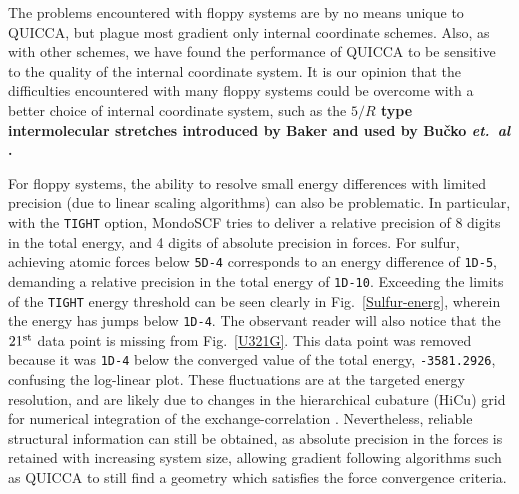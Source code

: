 \twolinestyle{\documentclass[prb,preprint]{revtex4}}
\begin{document}
The problems encountered with floppy systems are by no means unique to QUICCA,
but plague most gradient only internal coordinate schemes.  Also, as with other
schemes, we have found the performance of QUICCA to be sensitive to the quality 
of the internal coordinate system.  It is our opinion that the difficulties 
encountered with many floppy systems could be overcome with a better choice
of internal coordinate system, such as the {\bf  $5/R$ type intermolecular 
stretches introduced by Baker \cite{JBaker00} and used by  Bu\v{c}ko {\em et.~al} \cite{TBucko05}.
}


For floppy systems, the ability to resolve small energy differences with 
limited precision (due to linear scaling algorithms) can also be problematic.
In particular, with the {\tt TIGHT} option, {\sc MondoSCF} tries to deliver a 
relative precision of 8 digits in the total energy, and 4 digits of absolute 
precision in forces.  For sulfur, achieving atomic forces below {\tt 5D-4} 
corresponds to an energy difference of {\tt 1D-5}, demanding a relative 
precision in the total energy of {\tt 1D-10}.  Exceeding the limits of the
{\tt TIGHT} energy threshold can be seen clearly in Fig.~\ref{Sulfur-energ},
wherein the energy has jumps below {\tt 1D-4}.  The observant reader will also
notice that the $21^{\rm st}$ data point is missing from Fig.~\ref{U321G}.  This 
data point was removed because it was {\tt 1D-4} below the converged value of the 
total energy, {\tt   -3581.2926}, confusing the log-linear plot. These 
fluctuations are at the targeted energy resolution, and are likely due to 
changes in the hierarchical cubature (HiCu) grid for numerical integration of the 
exchange-correlation \cite{CTymczak05a}.  
Nevertheless, reliable structural information can still be obtained, as absolute 
precision in the forces is retained with increasing system size, allowing gradient following
algorithms such as QUICCA to still find a geometry which satisfies the force convergence
criteria. 
\end{document}
